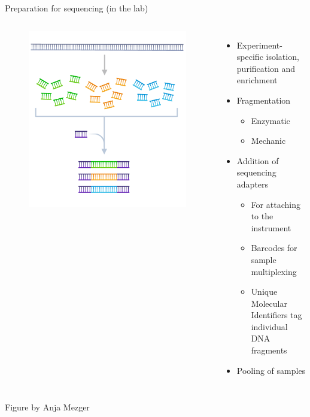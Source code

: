 \documentclass[10pt]{beamer}
\newcommand{\creditdarkleft}[1]{{\vspace{\fill} \par \raggedright \scriptsize \mdseries \color{scMGray} #1 \par}}
\begin{document}
\begin{frame}[standout]{Preparation for sequencing (in the lab)}
	\begin{columns}[T,onlytextwidth]
		\hspace*{-0.7cm} 
		\begin{figure}
			\includegraphics[width=\textwidth]{figures/library-prep.png}
		\end{figure}
			\normalsize \normalfont
			\begin{itemize}
				\item Experiment-specific isolation, purification and enrichment
				\item Fragmentation
				\begin{itemize}
					\item Enzymatic
					\item Mechanic
				\end{itemize}
				\item Addition of sequencing adapters 
				\begin{itemize}
					\item For attaching to the instrument
					\item Barcodes for sample multiplexing
					\item Unique Molecular Identifiers tag individual DNA fragments
				\end{itemize}
				\item Pooling of samples
			\end{itemize}
	\end{columns}
\creditdarkleft{Figure by Anja Mezger}
\end{frame}
\end{document}
